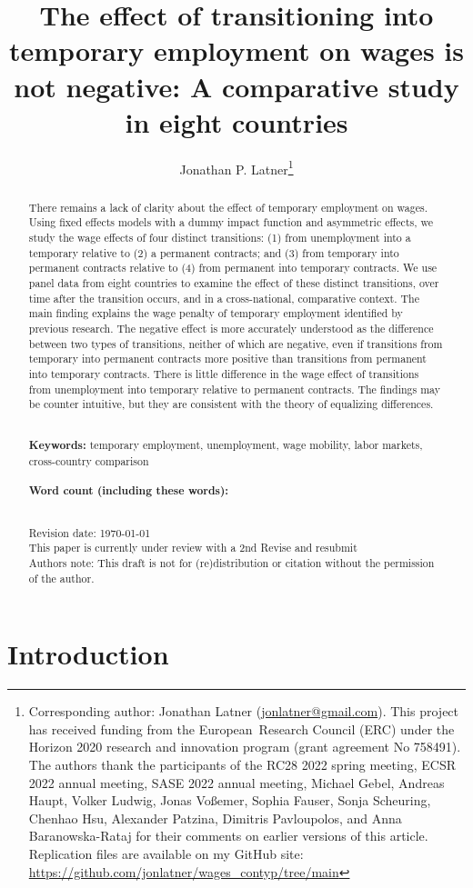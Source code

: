 \documentclass[12pt]{article}
\title{The effect of transitioning into temporary employment on wages is not negative: A comparative study in eight countries}
\author{Jonathan P. Latner\thanks{Corresponding author: Jonathan Latner (\url{jonlatner@gmail.com}).  This project has received funding from the European\ Research Council (ERC) under the Horizon 2020 research and innovation program (grant agreement No 758491).  The authors thank the participants of the RC28 2022 spring meeting, ECSR 2022 annual meeting, SASE 2022 annual meeting, Michael Gebel, Andreas Haupt, Volker Ludwig, Jonas Voßemer, Sophia Fauser, Sonja Scheuring, Chenhao Hsu, Alexander Patzina, Dimitris Pavloupolos, and Anna Baranowska-Rataj for their comments on earlier versions of this article.  Replication files are available on my GitHub site: \url{https://github.com/jonlatner/wages_contyp/tree/main}}}
\date{\vspace{-5ex}}
\newcommand\wordcount{}
\begin{document}
\maketitle

\begin{abstract}

\noindent 
There remains a lack of clarity about the effect of temporary employment on wages.  Using fixed effects models with a dummy impact function and asymmetric effects, we study the wage effects of four distinct transitions: (1) from unemployment into a temporary relative to (2) a permanent contracts; and (3) from temporary into permanent contracts relative to (4) from permanent into temporary contracts.  We use panel data from eight countries to examine the effect of these distinct transitions, over time after the transition occurs, and in a cross-national, comparative context.  The main finding explains the wage penalty of temporary employment identified by previous research.  The negative effect is more accurately understood as the difference between two types of transitions, neither of which are negative, even if transitions from temporary into permanent contracts more positive than transitions from permanent into temporary contracts.  There is little difference in the wage effect of transitions from unemployment into temporary relative to permanent contracts. The findings may be counter intuitive, but they are consistent with the theory of equalizing differences.  

\noindent
\\
{\bf Keywords:} temporary employment, unemployment, wage mobility, labor markets, cross-country comparison \\
\\
{\bf Word count (including these words):} \wordcount

\noindent
\\
Revision date: \today \\
This paper is currently under review with a 2nd Revise and resubmit \\
Authors note: This draft is not for (re)distribution or citation without the permission of the author. \\

\end{abstract}

\doublespacing
\clearpage
\section{Introduction}
\end{document}
